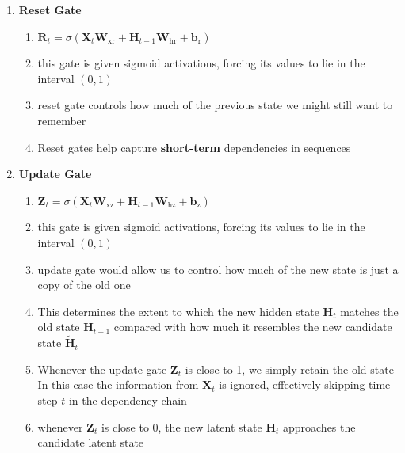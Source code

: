 \begin{enumerate}[itemsep=0.15cm]
    \item \textbf{Reset Gate}
    \begin{enumerate}
        \item $\mathbf{R}_t = \sigma(\mathbf{X}_t \mathbf{W}_{\textrm{xr}} + \mathbf{H}_{t-1} \mathbf{W}_{\textrm{hr}} + \mathbf{b}_\textrm{r})$
        
        \item this gate is given sigmoid activations, forcing its values to lie in the interval $(0,1)$

        \item reset gate controls how much of the previous state we might still want to remember

        \item Reset gates help capture \textbf{short-term} dependencies in sequences
    \end{enumerate}
    
    \item \textbf{Update Gate}
    \begin{enumerate}
        \item $\mathbf{Z}_t = \sigma(\mathbf{X}_t \mathbf{W}_{\textrm{xz}} + \mathbf{H}_{t-1} \mathbf{W}_{\textrm{hz}} + \mathbf{b}_\textrm{z})$

        
        \item this gate is given sigmoid activations, forcing its values to lie in the interval $(0,1)$

        \item update gate would allow us to control how much of the new state is just a copy of the old one

        \item This determines the extent to which the new hidden state $\mathbf{H}_t$ matches the old state $\mathbf{H}_{t-1}$ compared with how much it resembles the new candidate state $\tilde{\mathbf{H}}_t$

        \item Whenever the update gate $\mathbf{Z}_t$ is close to 1, we simply retain the old state\\
        In this case the information from $\mathbf{X}_t$ is ignored, effectively skipping time step $t$ in the dependency chain

        \item whenever $\mathbf{Z}_t$ is close to 0, the new latent state $\mathbf{H}_t$ approaches the candidate latent state


\end{enumerate}
\end{enumerate}
